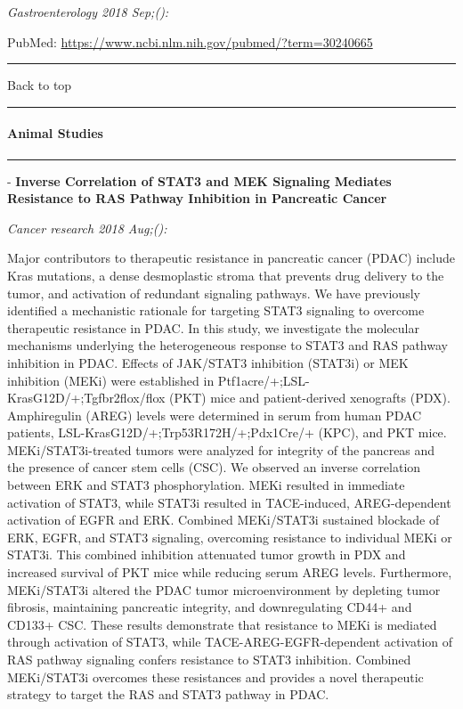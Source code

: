 \documentclass[]{article}
\let\oldparagraph\paragraph
\renewcommand{\paragraph}[1]{\oldparagraph{#1}\mbox{}}
\begin{document}
\emph{Gastroenterology 2018 Sep;():}

PubMed: \url{https://www.ncbi.nlm.nih.gov/pubmed/?term=30240665}

{}

{}

\begin{center}\rule{0.5\linewidth}{\linethickness}\end{center}

Back to top

\begin{center}\rule{0.5\linewidth}{\linethickness}\end{center}

\pagebreak

\hypertarget{animal-studies}{%
\paragraph{Animal Studies}\label{animal-studies}}

\begin{center}\rule{0.5\linewidth}{\linethickness}\end{center}

 - \textbf{Inverse Correlation of STAT3 and MEK Signaling Mediates
Resistance to RAS Pathway Inhibition in Pancreatic Cancer}

\emph{Cancer research 2018 Aug;():}

Major contributors to therapeutic resistance in pancreatic cancer (PDAC)
include Kras mutations, a dense desmoplastic stroma that prevents drug
delivery to the tumor, and activation of redundant signaling pathways.
We have previously identified a mechanistic rationale for targeting
STAT3 signaling to overcome therapeutic resistance in PDAC. In this
study, we investigate the molecular mechanisms underlying the
heterogeneous response to STAT3 and RAS pathway inhibition in PDAC.
Effects of JAK/STAT3 inhibition (STAT3i) or MEK inhibition (MEKi) were
established in Ptf1acre/+;LSL-KrasG12D/+;Tgfbr2flox/flox (PKT) mice and
patient-derived xenografts (PDX). Amphiregulin (AREG) levels were
determined in serum from human PDAC patients,
LSL-KrasG12D/+;Trp53R172H/+;Pdx1Cre/+ (KPC), and PKT mice.
MEKi/STAT3i-treated tumors were analyzed for integrity of the pancreas
and the presence of cancer stem cells (CSC). We observed an inverse
correlation between ERK and STAT3 phosphorylation. MEKi resulted in
immediate activation of STAT3, while STAT3i resulted in TACE-induced,
AREG-dependent activation of EGFR and ERK. Combined MEKi/STAT3i
sustained blockade of ERK, EGFR, and STAT3 signaling, overcoming
resistance to individual MEKi or STAT3i. This combined inhibition
attenuated tumor growth in PDX and increased survival of PKT mice while
reducing serum AREG levels. Furthermore, MEKi/STAT3i altered the PDAC
tumor microenvironment by depleting tumor fibrosis, maintaining
pancreatic integrity, and downregulating CD44+ and CD133+ CSC. These
results demonstrate that resistance to MEKi is mediated through
activation of STAT3, while TACE-AREG-EGFR-dependent activation of RAS
pathway signaling confers resistance to STAT3 inhibition. Combined
MEKi/STAT3i overcomes these resistances and provides a novel therapeutic
strategy to target the RAS and STAT3 pathway in PDAC.
\end{document}
